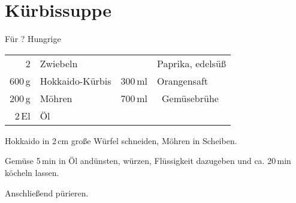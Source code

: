 \section{K\"{u}rbissuppe}
\begin{centering}
F\"{u}r ? Hungrige
\end{centering}
\begin{table}[H]
  \centering
  \begin{tabular*}{1\textwidth}{rlrl}
    2 & Zwiebeln  &&Paprika, edels\"{u}{\ss} \\
    600\,g & Hokkaido-K\"{u}rbis & 300\,ml & Orangensaft\\
    200\,g & M\"{o}hren & 700\,ml &\ Gem\"{u}sebr\"{u}he \\
    2\,El & \"{O}l &&\\
  \end{tabular*}
\end{table}

\begin{Notes}
\item Hokkaido in 2\,cm gro{\ss}e W\"{u}rfel schneiden, M\"{o}hren in Scheiben.
\item Gem\"{u}se 5\,min in \"{O}l and\"{u}nsten, w\"{u}rzen, Fl\"{u}ssigkeit
  dazugeben und ca. 20\,min k\"{o}cheln lassen.
\item Anschlie{\ss}end p\"{u}rieren.
\end{Notes}




